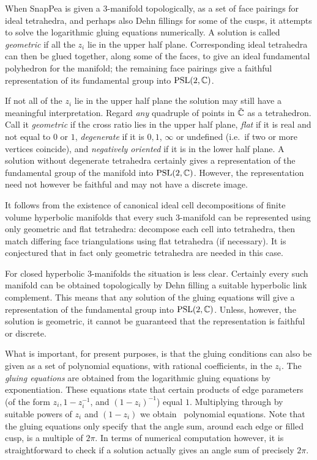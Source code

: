 \documentclass[a4paper]{amsart}
\def\C{{\mathbb C}}
\def\psl2c{\mbox{\rm PSL}(2,\C)}
\theoremstyle{definition}
\begin{document}
When SnapPea is given a 3-manifold topologically, as a set of face
pairings for ideal tetrahedra, and perhaps also Dehn fillings for some
of the cusps, it attempts to solve the logarithmic gluing equations numerically.
A solution is called {\em geometric} if all the $z_i$ lie in the upper
half plane. Corresponding ideal tetrahedra
can then be glued together, along some of the faces, to give an ideal
fundamental polyhedron for the manifold; the remaining face pairings
give a faithful representation of its fundamental group into $\psl2c$. 

If not all of the $z_i$ lie in the upper half plane the solution may
still have a meaningful interpretation. Regard {\em any} quadruple of
points in $\Ct$ as a tetrahedron. Call it {\em geometric} if the cross
ratio lies in the upper half plane, {\em flat} if it is real and not
equal to $0$ or $1$, {\em degenerate} if it is $0, 1$, $\infty$ or
undefined (i.e.\ if two or more vertices coincide), and {\em negatively
oriented} if it is in the lower half plane.  A solution without
degenerate tetrahedra certainly gives a representation of the
fundamental group of the manifold into $\psl2c$. However, the representation
need not however be faithful and may not have a discrete image.

It follows from the existence of canonical ideal cell decompositions
of finite volume hyperbolic manifolds \cite{ep} that every such 3-manifold
can be represented using only geometric and flat tetrahedra: decompose
each cell into tetrahedra, then match differing face triangulations
using flat tetrahedra (if necessary). It is conjectured that in fact 
only geometric tetrahedra are needed in this case. 

For closed hyperbolic 3-manifolds the situation is less
clear. Certainly every such manifold can be obtained topologically by
Dehn filling a suitable hyperbolic link complement.  This means that
any solution of the gluing equations will give a representation of
the fundamental group into $\psl2c$. Unless, however, the solution
is geometric, it cannot be guaranteed that the representation is
faithful or discrete. 


What is important, for present purposes, is that the gluing conditions can
also be given as a set of polynomial equations, with rational coefficients,
in the $z_i$. The {\em gluing equations} are obtained from the logarithmic gluing
equations by exponentiation. These equations state
 that certain products of edge parameters (of
the form $z_i, 1-z_i^{-1}$, and $(1-z_i)^{-1}$) equal $1$. Multiplying
through by suitable powers of $z_i$ and $(1-z_i)$ we obtain \
polynomial equations. Note
that the gluing equations only specify that the angle sum, around each
edge or filled cusp, is a multiple of $2\pi$. In terms of numerical
computation however, it is straightforward to check if a solution
actually gives an angle sum of precisely $2\pi$.
\end{document}
